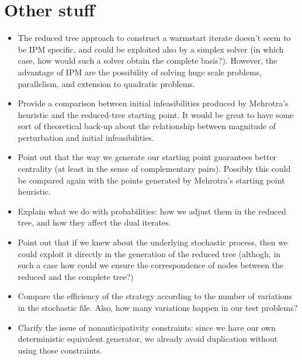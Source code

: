 {%
%


%
%

%
%
\section{Other stuff}

\begin{itemize}
\item The reduced tree approach to construct a warmstart iterate 
doesn't seem to be IPM specific, and could be exploited also by a 
simplex solver (in which case, how would such a solver obtain the 
complete basis?). However, the advantage of IPM are the possibility 
of solving huge scale problems, parallelism, and extension to 
quadratic problems.

\item Provide a comparison between initial infeasibilities 
produced by Mehrotra's heuristic and the reduced-tree starting 
point. It would be great to have some sort of theoretical back-up 
about the relationship between magnitude of perturbation and 
initial infeasibilities.

\item Point out that the way we generate our starting point 
guarantees better centrality (at least in the sense of 
complementary pairs). Possibly this could be compared again 
with the points generated by Mehrotra's starting point heuristic.

\item Explain what we do with probabilities: how we adjust them 
in the reduced tree, and how they affect the dual iterates.

\item Point out that if we knew about the underlying 
stochastic process, then we could exploit it directly in the 
generation of the reduced tree (althogh, in such a case how 
could we ensure the correspondence of nodes between the reduced 
and the complete tree?)

\item Compare the efficiency of the strategy according to the 
number of variations in the stochastic file. Also, how many 
variations happen in our test problems?

\item Clarify the issue of nonanticipativity constraints: 
since we have our own deterministic equivalent generator, we 
already avoid duplication without using those constraints.


\end{itemize}}
